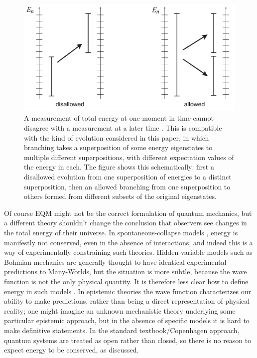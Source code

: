 \documentclass[12pt,aps,prd,onecolumn,nofootinbib,notitlepage]{revtex4-1}
\begin{document}
\begin{figure}[h]
\centering
\includegraphics[width=.6\textwidth]{allowed.pdf}
\caption{A measurement of total energy at one moment in time cannot disagree with a measurement at a later time \cite{griffiths,hartle1995conservation}.
This is compatible with the kind of evolution considered in this paper, in which branching takes a superposition of some energy eigenstates to multiple different superpositions, with different expectation values of the energy in each.
The figure shows this schematically: first a disallowed evolution from one superposition of energies to a distinct superposition, then an allowed branching from one superposition to others formed from different subsets of the original eigenstates.}
\label{fig:allowed}
\end{figure}

Of course EQM might not be the correct formulation of quantum mechanics, but a different theory shouldn't change the conclusion that observers see changes in the total energy of their universe.
In spontaneous-collapse models \cite{Ghirardi:1985mt,Pearle:1988uh,Ghirardi:1989cn}, energy is manifestly not conserved, even in the absence of interactions, and indeed this is a way of experimentally constraining such theories.
Hidden-variable models such as Bohmian mechanics \cite{duerr2009bohmian} are generally thought to have identical experimental predictions to Many-Worlds, but the situation is more subtle, because the wave function is not the only physical quantity.
It is therefore less clear how to define energy in such models \cite{Maudlin:2019bje}.
In epistemic theories \cite{leifer2014quantum} the wave function characterizes our ability to make predictions, rather than being a direct representation of physical reality; one might imagine an unknown mechanistic theory underlying some particular epistemic approach, but in the absence of specific models it is hard to make definitive statements.
In the standard textbook/Copenhagen approach, quantum systems are treated as open rather than closed, so there is no reason to expect energy to be conserved, as discussed.
\end{document}
